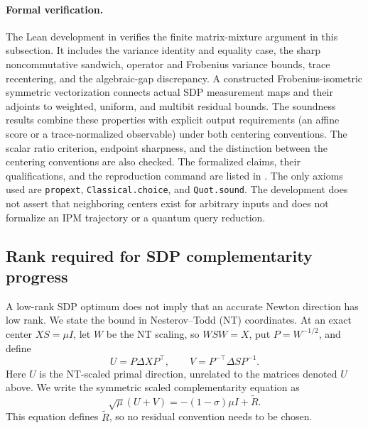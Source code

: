 \paragraph{Formal verification.}
The Lean development in  verifies the
finite matrix-mixture argument in this subsection.  It includes the
variance identity and equality case, the sharp noncommutative sandwich,
operator and Frobenius variance bounds, trace recentering, and the
algebraic-gap discrepancy.  A constructed Frobenius-isometric symmetric
vectorization connects actual SDP measurement maps and their adjoints to
weighted, uniform, and multibit residual bounds.  The soundness results
combine these properties with explicit output requirements (an affine score
or a trace-normalized observable) under both centering conventions.  The
scalar ratio criterion, endpoint sharpness, and the distinction between the
centering conventions are also checked.  The formalized claims, their
qualifications, and the reproduction command are listed in
.  The only axioms used are
\texttt{propext}, \texttt{Classical.choice}, and \texttt{Quot.sound}.  The
development does not assert that neighboring centers exist for arbitrary
inputs and does not formalize an IPM trajectory or a quantum query
reduction.

\subsection{Rank required for SDP complementarity progress}
\label{sec:structural-rank-progress}

A low-rank SDP optimum does not imply that an accurate Newton direction has
low rank.  We state the bound in Nesterov--Todd (NT) coordinates.  At
an exact center $XS=\mu I$, let $W$ be the NT scaling, so $WSW=X$, put
$P=W^{-1/2}$, and define
\begin{equation}
 U=P\Delta XP^\top,\qquad V=P^{-\top}\Delta SP^{-1}.
\end{equation}
Here $U$ is the NT-scaled primal direction, unrelated to the matrices
denoted $U$ above.
We write the symmetric scaled complementarity equation as
\begin{equation}
 \sqrt\mu(U+V)=-(1-\sigma)\mu I+\widetilde R.             \label{eq:structural-scaled-complementarity}
\end{equation}
This equation defines $\widetilde R$, so no residual convention needs to be
chosen.

